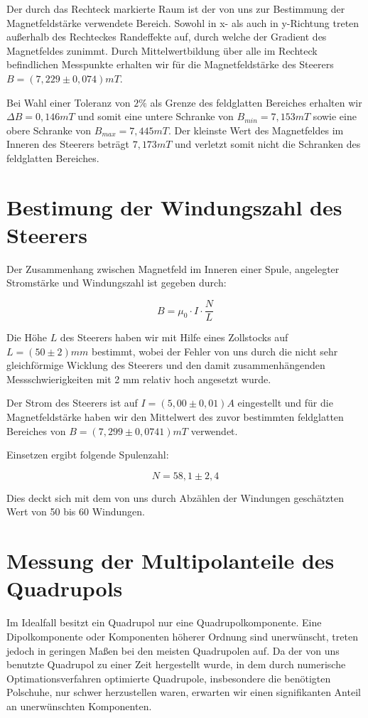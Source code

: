 \documentclass[bigchapter,colorback,accentcolor=tud4b,linedtoc,11pt]{tudreport}
\begin{document}
Der durch das Rechteck markierte Raum ist der von uns zur Bestimmung der Magnetfeldstärke verwendete Bereich. Sowohl in x- als auch in y-Richtung treten außerhalb des Rechteckes Randeffekte auf, durch welche der Gradient des Magnetfeldes zunimmt. Durch Mittelwertbildung über alle im Rechteck befindlichen Messpunkte erhalten wir für die Magnetfeldstärke des Steerers $B=(7,229 \pm 0,074)mT$.


Bei Wahl einer Toleranz von $2\%$ als Grenze des feldglatten Bereiches erhalten wir $\Delta B=0,146mT$ und somit eine untere Schranke von $B_{min}=7,153mT$ sowie eine obere Schranke von $B_{max} = 7,445mT$. Der kleinste Wert des Magnetfeldes im Inneren des Steerers beträgt $7,173mT$ und verletzt somit nicht die Schranken des feldglatten Bereiches.

\section{Bestimung der Windungszahl des Steerers}
Der Zusammenhang zwischen Magnetfeld im Inneren einer Spule, angelegter Stromstärke und Windungszahl ist gegeben durch:

$$B = \mu_{0} \cdot I \cdot \frac{N}{L}$$

Die Höhe $L$ des Steerers haben wir mit Hilfe eines Zollstocks auf $L=(50\pm 2)mm$ bestimmt, wobei der Fehler von uns durch die nicht sehr gleichförmige Wicklung des Steerers und den damit zusammenhängenden Messschwierigkeiten mit 2 mm relativ hoch angesetzt wurde.

Der Strom des Steerers ist auf $I=(5,00 \pm 0,01)A$ eingestellt und für die Magnetfeldstärke haben wir den Mittelwert des zuvor bestimmten feldglatten Bereiches von $B=(7,299 \pm 0,0741)mT$ verwendet.

Einsetzen ergibt folgende Spulenzahl:

$$N= 58,1 \pm 2,4$$

Dies deckt sich mit dem von uns durch Abzählen der Windungen geschätzten Wert von 50 bis 60 Windungen.


\section{Messung der Multipolanteile des Quadrupols}

Im Idealfall besitzt ein Quadrupol nur eine Quadrupolkomponente. Eine Dipolkomponente oder Komponenten höherer Ordnung sind unerwünscht, treten jedoch in geringen Maßen bei den meisten Quadrupolen auf. Da der von uns benutzte Quadrupol zu einer Zeit hergestellt wurde, in dem durch numerische Optimationsverfahren optimierte Quadrupole, insbesondere die benötigten Polschuhe, nur schwer herzustellen waren, erwarten wir einen signifikanten Anteil an unerwünschten Komponenten.
\end{document}
